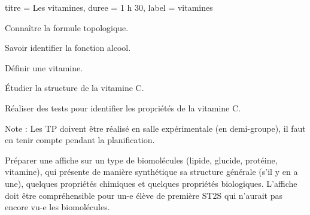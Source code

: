 \begin{multicols}{2}
  \begin{TP}{titre = Les vitamines, duree = 1 h 30, label = vitamines}
    \begin{prerequis}
      \item Connaître la formule topologique.
      \item Savoir identifier la fonction alcool.
    \end{prerequis}
    \begin{objectifs}
      \item Définir une vitamine.
      \item Étudier la structure de la vitamine C.
      \item Réaliser des tests pour identifier les propriétés de la vitamine C.
    \end{objectifs}
  \end{TP}
\end{multicols}


Note :
Les TP doivent être réalisé en salle expérimentale (en demi-groupe), il faut en tenir compte pendant la planification.


\newpage
\nomPrenomClasse
{}
\vspace*{12pt}


\begin{programmeSeance}
  \seance \seance \seance
\end{programmeSeance}

\begin{programmeSeance}[nombre = 2]
  \seance \seance
\end{programmeSeance}

\begin{programmeSeance}[nombre = 2, distance = 0 pt]
\end{programmeSeance}


\begin{tacheFinale}
  Préparer une affiche  sur un type de biomolécules (lipide, glucide, protéine, vitamine), qui présente de manière synthétique sa structure générale  (s'il y en a une), quelques propriétés chimiques et quelques propriétés biologiques.
  L'affiche doit être compréhensible pour un-e élève de première \textsc{ST2S} qui n'aurait pas encore vu-e les biomolécules.
\end{tacheFinale}


